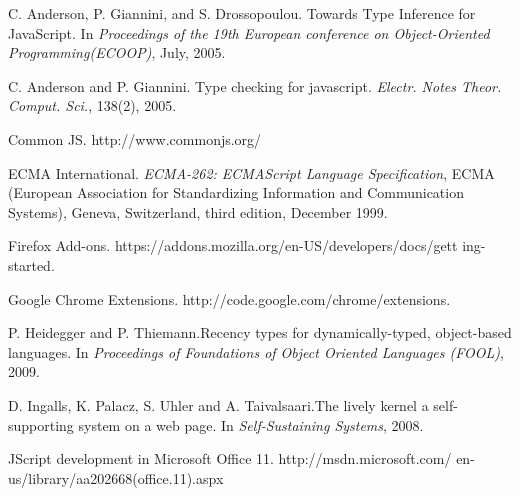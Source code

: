 \documentclass{acm_proc_article-sp}
\begin{document}

%

%
%
%

\begin{thebibliography}{10}

C. Anderson, P. Giannini, and S. Drossopoulou. \newblock Towards Type Inference for JavaScript.
\newblock In \emph{Proceedings of the 19th European conference on Object-Oriented Programming(ECOOP)},
July, 2005.

C. Anderson and P. Giannini. \newblock Type checking for javascript.
\newblock \emph{Electr. Notes Theor. Comput. Sci.}, 138(2), 2005. 

Common JS.
\newblock http://www.commonjs.org/

ECMA International.
\newblock \emph{ECMA-262: ECMAScript Language Specification},
ECMA (European Association for Standardizing Information
and Communication Systems), Geneva, Switzerland, third edition,
December 1999. 

Firefox Add-ons.
\newblock https://addons.mozilla.org/en-US/developers/docs/gett ing-started.

Google Chrome Extensions.
\newblock http://code.google.com/chrome/extensions.

P. Heidegger and P. Thiemann.\newblock Recency types for dynamically-typed, object-based languages.
\newblock In \emph{Proceedings of Foundations of Object Oriented Languages (FOOL)},
2009.

D. Ingalls, K. Palacz, S. Uhler and A. Taivalsaari.\newblock The lively kernel a self-supporting system on
a web page.
\newblock In \emph{Self-Sustaining Systems},
2008.

JScript development in Microsoft Office 11.
\newblock http://msdn.microsoft.com/ en-us/library/aa202668(office.11).aspx


\end{thebibliography}
\end{document}
